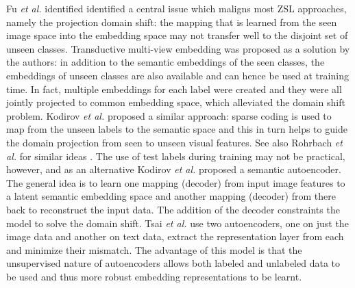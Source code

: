 \documentclass[12pt]{report}
\begin{document}
Fu \textit{et al.} \cite{Fu2015} identified identified a central issue which maligns most ZSL approaches, namely the projection domain shift: the mapping that is learned from the seen image space into the embedding space may not transfer well to the disjoint set of unseen classes. Transductive multi-view embedding was proposed as a solution by the authors: in addition to the semantic embeddings of the seen classes, the embeddings of unseen classes are also available and can hence be used at training time. In fact, multiple embeddings for each label were created and they were all jointly projected to common embedding space, which alleviated the domain shift problem. Kodirov \textit{et al.} \cite{Kodirov2015} proposed a similar approach: sparse coding is used to map from the unseen labels to the semantic space and this in turn helps to guide the domain projection from seen to unseen visual features. See also Rohrbach \textit{et al.} for similar ideas \cite{Rohrbach2013}. The use of test labels during training may not be practical, however, and as an alternative Kodirov \textit{et al.} \cite{Kodirov2017} proposed a semantic autoencoder. The general idea is to learn one mapping (decoder) from input image features to a latent semantic embedding space and another mapping (decoder) from there back to reconstruct the input data. The addition of the decoder constraints the model to solve the domain shift. Tsai \textit{et al.} \cite{Tsai2016} use two autoencoders, one on just the image data and another on text data, extract the representation layer from each and minimize their mismatch. The advantage of this model is that the unsupervised nature of autoencoders allows both labeled and unlabeled data to be used and thus more robust embedding representations to be learnt.
\end{document}
